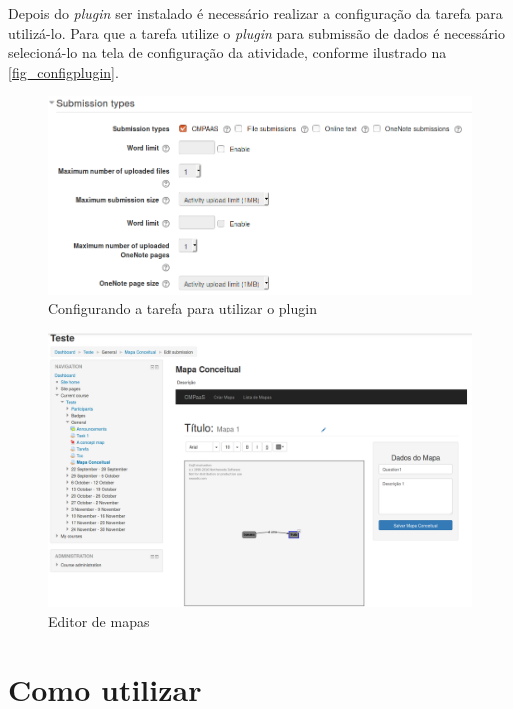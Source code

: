 \documentclass[
	12pt,				%
	openright,			%
	oneside,			%
	a4paper,			%
	english,			%
	french,				%
	spanish,			%
	brazil				%
	]{abntex2}
\begin{document}
Depois do \textit{plugin} ser instalado é necessário realizar a configuração da tarefa para utilizá-lo. Para que a tarefa utilize o \textit{plugin} para submissão de dados é necessário selecioná-lo na tela de configuração da atividade, conforme ilustrado na \autoref{fig_configplugin}.

\begin{figure}[htb]
	\caption{\label{fig_configplugin} Configurando a tarefa para utilizar o plugin}
	\begin{center}
		\includegraphics[scale=0.4]{configplugin.png}
	\end{center}
\end{figure}

\begin{figure}[htb]
	\caption{\label{fig_editor2} Editor de mapas}
	\begin{center}
		\includegraphics[scale=0.2]{editor.png}
	\end{center}
\end{figure}

\section{Como utilizar}
\end{document}
